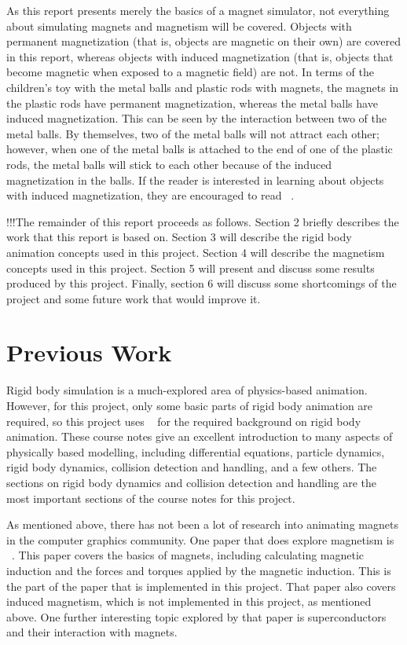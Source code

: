 \documentclass[tog]{acmsiggraph}
\begin{document}
As this report presents merely the basics of a magnet simulator, not everything about simulating magnets and magnetism will be covered. Objects with permanent magnetization (that is, objects are magnetic on their own) are covered in this report, whereas objects with induced magnetization (that is, objects that become magnetic when exposed to a magnetic field) are not. In terms of the children's toy with the metal balls and plastic rods with magnets, the magnets in the plastic rods have permanent magnetization, whereas the metal balls have induced magnetization. This can be seen by the interaction between two of the metal balls. By themselves, two of the metal balls will not attract each other; however, when one of the metal balls is attached to the end of one of the plastic rods, the metal balls will stick to each other because of the induced magnetization in the balls. If the reader is interested in learning about objects with induced magnetization, they are encouraged to read ~\cite{Thomaszewski:2008:MIM}.

!!!The remainder of this report proceeds as follows. Section 2 briefly describes the work that this report is based on. Section 3 will describe the rigid body animation concepts used in this project. Section 4 will describe the magnetism concepts used in this project. Section 5 will present and discuss some results produced by this project. Finally, section 6 will discuss some shortcomings of the project and some future work that would improve it.

\section{Previous Work}

Rigid body simulation is a much-explored area of physics-based animation. However, for this project, only some basic parts of rigid body animation are required, so this project uses ~\cite{pixarnotes} for the required background on rigid body animation. These course notes give an excellent introduction to many aspects of physically based modelling, including differential equations, particle dynamics, rigid body dynamics, collision detection and handling, and a few others. The sections on rigid body dynamics and collision detection and handling are the most important sections of the course notes for this project.

As mentioned above, there has not been a lot of research into animating magnets in the computer graphics community. One paper that does explore magnetism is ~\cite{Thomaszewski:2008:MIM}. This paper covers the basics of magnets, including calculating magnetic induction and the forces and torques applied by the magnetic induction. This is the part of the paper that is implemented in this project. That paper also covers induced magnetism, which is not implemented in this project, as mentioned above. One further interesting topic explored by that paper is superconductors and their interaction with magnets.
\end{document}
